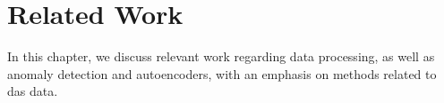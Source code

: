\chapter{Related Work}
\label{chap:relwork}

In this chapter, we discuss relevant work regarding data processing, as well as anomaly detection and autoencoders, with an emphasis on methods related to \acrshort{das} data. \\








